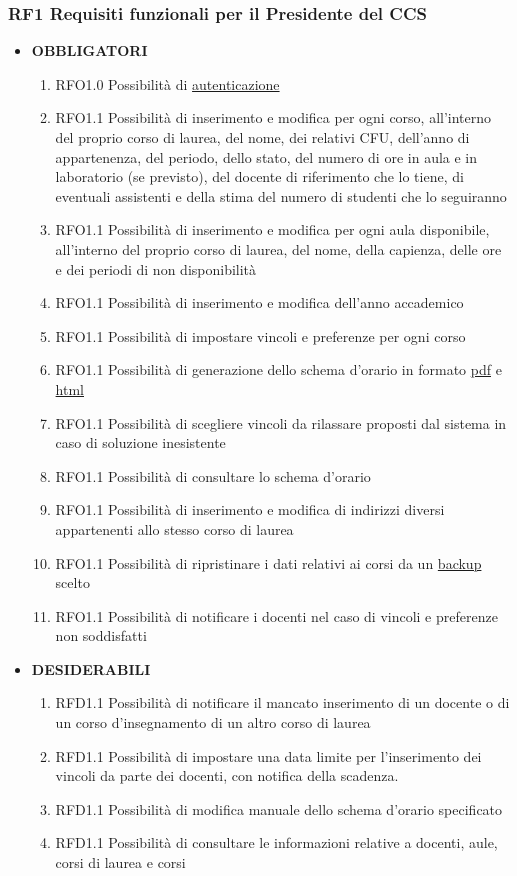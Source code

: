 \documentclass[11pt,a4paper]{article}
\begin{document}
\subsubsection{RF1 Requisiti funzionali per il Presidente del CCS}
\begin{itemize}
\item \textbf{OBBLIGATORI}
\begin{enumerate}
\item RFO1.0 Possibilità di \underline{autenticazione}
\item RFO1.1 Possibilità di inserimento e modifica per ogni corso, all'interno del proprio corso di laurea, del nome, dei relativi CFU, dell'anno di appartenenza, del periodo, dello stato, del numero di ore in aula e in laboratorio (se previsto), del docente di riferimento che lo tiene, di eventuali assistenti e della stima del numero di studenti che lo seguiranno
\item RFO1.1 Possibilità di inserimento e modifica per ogni aula disponibile, all'interno del proprio corso di laurea, del nome, della capienza, delle ore e dei periodi di non disponibilità
\item RFO1.1 Possibilità di inserimento e modifica dell'anno accademico
\item RFO1.1 Possibilità di impostare vincoli e preferenze per ogni corso
\item RFO1.1 Possibilità di generazione dello schema d'orario in formato \underline{pdf} e \underline{html}
\item RFO1.1 Possibilità di scegliere vincoli da rilassare proposti dal sistema in caso di soluzione inesistente
\item RFO1.1 Possibilità di consultare lo schema d'orario
\item RFO1.1 Possibilità di inserimento e modifica di indirizzi diversi appartenenti allo stesso corso di laurea
\item RFO1.1 Possibilità di ripristinare i dati relativi ai corsi da un \underline{backup} scelto
\item RFO1.1 Possibilità di notificare i docenti nel caso di vincoli e preferenze non soddisfatti
\end{enumerate}
\item \textbf{DESIDERABILI}
\begin{enumerate}
\item RFD1.1 Possibilità di notificare il mancato inserimento di un docente o di un corso d'insegnamento di un altro corso di laurea
\item RFD1.1 Possibilità di impostare una data limite per l'inserimento dei vincoli da parte dei docenti, con notifica della scadenza.
\item RFD1.1 Possibilità di modifica manuale dello schema d'orario specificato
\item RFD1.1 Possibilità di consultare le informazioni relative a docenti, aule, corsi di laurea e corsi
\end{enumerate}
\end{itemize}
\end{document}
